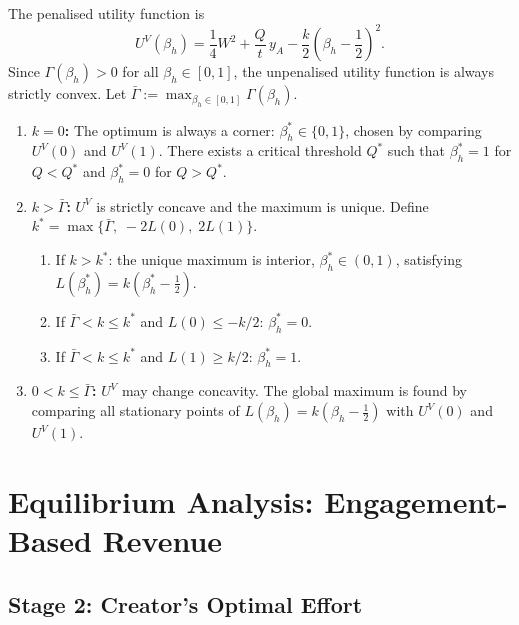 \documentclass[mnsc,nonblindrev]{informs3_NoOR}
\begin{document}
\begin{proposition}\label{prop:beta-view}
The penalised utility function is
\begin{equation}\label{eq:VV}
U^V(\beta_h) = \frac{1}{4}W^2 + \frac{Q}{t}\,y_A - \frac{k}{2}\!\left(\beta_h - \frac{1}{2}\right)^{\!2}.
\end{equation}
Since $\Gamma(\beta_h) > 0$ for all $\beta_h \in [0,1]$, the unpenalised utility function is always strictly convex.  Let $\bar{\Gamma} := \max_{\beta_h \in [0,1]} \Gamma(\beta_h)$.
\begin{enumerate}
\item[\textup{(i)}] \textbf{$k = 0$:} The optimum is always a corner: $\beta_h^* \in \{0,1\}$, chosen by comparing $U^V(0)$ and $U^V(1)$. There exists a critical threshold $Q^*$ such that $\beta_h^* = 1$ for $Q < Q^*$ and $\beta_h^* = 0$ for $Q > Q^*$.
 
\item[\textup{(ii)}] \textbf{$k > \bar\Gamma$:} $U^V$ is strictly concave and the maximum is unique. Define $k^* = \max\!\big\{\bar\Gamma,\; -2L(0),\; 2L(1)\big\}$.
\begin{enumerate}
\item[\textup{(a)}] If $k > k^*$: the unique maximum is interior, $\beta_h^* \in (0,1)$, satisfying $L(\beta_h^*) = k(\beta_h^* - \frac{1}{2})$.
\item[\textup{(b)}] If $\bar\Gamma < k \leq k^*$ and $L(0) \leq -k/2$: $\beta_h^* = 0$.
\item[\textup{(c)}] If $\bar\Gamma < k \leq k^*$ and $L(1) \geq k/2$: $\beta_h^* = 1$.
\end{enumerate}
 
\item[\textup{(iii)}] \textbf{$0 < k \leq \bar\Gamma$:} $U^V$ may change concavity. The global maximum is found by comparing all stationary points of $L(\beta_h) = k(\beta_h - \frac{1}{2})$ with $U^V(0)$ and $U^V(1)$.
\end{enumerate}
\end{proposition}
 
\section{Equilibrium Analysis: Engagement-Based Revenue}\label{sec:eng}
 
\subsection{Stage 2: Creator's Optimal Effort}
 
\end{document}
